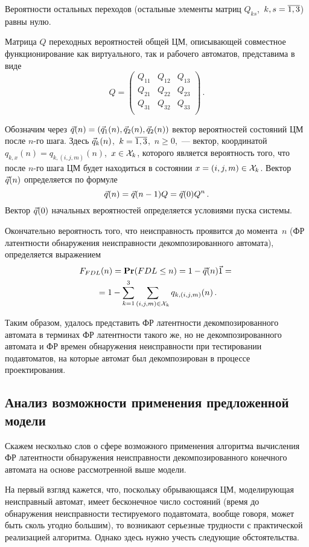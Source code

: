 \begin{multicols}{2}
Вероятности остальных переходов (остальные элементы матриц
$Q_{ks}$,\ $k,s=\overline{1,3}$) равны нулю.

 Матрица $Q$ переходных вероятностей общей ЦМ, описывающей совместное
функционирование как виртуального, так и рабочего автоматов, представима
в виде
$$
Q
=
\begin{pmatrix}
 Q_{11} & Q_{12} & Q_{13} \\
 Q_{21} & Q_{22} & Q_{23} \\
 Q_{31} & Q_{32} & Q_{33} \\
\end{pmatrix}\,.
$$

 Обозначим через $\vec q(n)=(\vec q_1(n),\vec q_2(n),\vec q_2(n))$
вектор вероятностей состояний ЦМ после $n$-го шага.
Здесь $\vec q_k(n)$,\ $k=\overline{1,3}$,\ $n\ge 0$,~--- вектор, координатой
$q_{k,x}(n)=q_{k,(i,j,m)}(n)$,\ $x\in {\cal X}_k$, которого является
вероятность того, что после $n$-го шага ЦМ будет находиться в состоянии
$x=(i,j,m)\in {\cal X}_k$.
Вектор~$\vec q(n)$ определяется по формуле
$$
\vec q(n) = \vec q(n-1) Q = \vec q(0) Q^n\,.
$$
Вектор $\vec q(0)$ начальных вероятностей определяется условиями пуска системы.


 Окончательно вероятность того, что неисправность проявится до момента~$n$
 (ФР латентности обнаружения неисправности декомпозированного автомата),
определяется выражением
\begin{multline*}
F_{FDL}(n)
=
{\bf Pr}(FDL\le n)
=
1 - \vec q(n) \vec1 ={}\\
{}=
1 - \sum\limits_{k=1}^3 \sum\limits_{(i,j,m)\in {\cal X}_k} q_{k,(i,j,m)}(n)\,.
\end{multline*}

Таким образом, удалось представить ФР латентности декомпозированного
автомата в терминах ФР латентности такого же, но не декомпозированного
автомата и ФР времен обнаружения не\-ис\-прав\-ности при тестировании подавтоматов,
на которые автомат был декомпозирован в процессе проектирования.

\subsection{Анализ возможности применения предложенной модели}

Скажем несколько слов о сфере возможного применения алгоритма
вычисления ФР ла\-тент\-ности обнаружения неисправности декомпозированного
конечного автомата на основе рассмотренной выше модели.

На первый взгляд кажется, что, поскольку обрывающаяся ЦМ, моделирующая
неисправный автомат, имеет бесконечное число состояний (время до
обнаружения неисправности тес\-ти\-ру\-емо\-го под\-ав\-то\-ма\-та, вообще говоря,
может быть сколь угодно большим), то возникают серьезные трудности
с практической реализацией алгоритма.
Однако здесь нужно учесть следующие обстоятельства.


\end{multicols}
